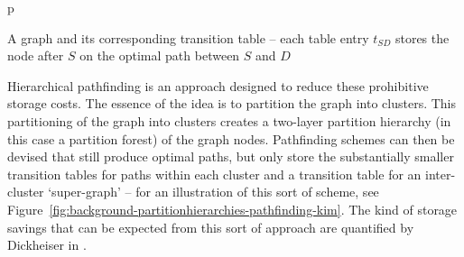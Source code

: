 \begin{stusubfig}{p}
	\hspace{4mm}%
\caption[A graph and its corresponding transition table]{A graph and its corresponding transition table -- each table entry $t_{SD}$ stores the node after $S$ on the optimal path between $S$ and $D$}
\label{fig:background-partitionhierarchies-pathfinding-transitiontable}
\end{stusubfig}

Hierarchical pathfinding is an approach designed to reduce these prohibitive storage costs. The essence of the idea is to partition the graph into clusters. This partitioning of the graph into clusters creates a two-layer partition hierarchy (in this case a partition forest) of the graph nodes. Pathfinding schemes can then be devised that still produce optimal paths, but only store the substantially smaller transition tables for paths within each cluster and a transition table for an inter-cluster `super-graph' -- for an illustration of this sort of scheme, see Figure~\ref{fig:background-partitionhierarchies-pathfinding-kim}. The kind of storage savings that can be expected from this sort of approach are quantified by Dickheiser in \cite{dickheiser04}.

